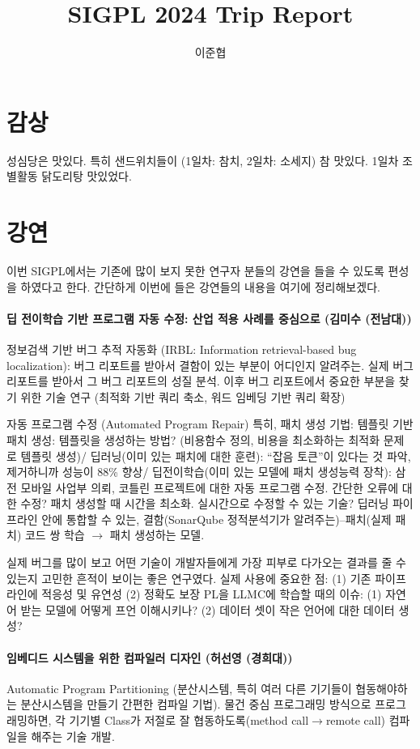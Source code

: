 \documentclass{article}
\title{SIGPL 2024 Trip Report}
\author{이준협}
\begin{document}
\maketitle
\section{감상}
성심당은 맛있다. 특히 샌드위치들이 (1일차: 참치, 2일차: 소세지) 참 맛있다.
1일차 조별활동 닭도리탕 맛있었다.
\section{강연}
이번 SIGPL에서는 기존에 많이 보지 못한 연구자 분들의 강연을 들을 수 있도록 편성을 하였다고 한다.
간단하게 이번에 들은 강연들의 내용을 여기에 정리해보겠다.

\paragraph{딥 전이학습 기반 프로그램 자동 수정: 산업 적용 사례를 중심으로 (김미수 (전남대))}
정보검색 기반 버그 추적 자동화 (IRBL: Information retrieval-based bug localization): 버그 리포트를 받아서 결함이 있는 부분이 어디인지 알려주는. 실제 버그 리포트를 받아서 그 버그 리포트의 성질 분석.
이후 버그 리포트에서 중요한 부분을 찾기 위한 기술 연구 (최적화 기반 쿼리 축소, 워드 임베딩 기반 쿼리 확장)

자동 프로그램 수정 (Automated Program Repair)
특히, 패치 생성 기법: 템플릿 기반 패치 생성: 템플릿을 생성하는 방법? (비용함수 정의, 비용을 최소화하는 최적화 문제로 템플릿 생성)/
딥러닝(이미 있는 패치에 대한 훈련): ``잡음 토큰''이 있다는 것 파악, 제거하니까 성능이 88\% 향상/
딥전이학습(이미 있는 모델에 패치 생성능력 장착): 삼전 모바일 사업부 의뢰, 코틀린 프로젝트에 대한 자동 프로그램 수정. 간단한 오류에 대한 수정?
패치 생성할 때 시간을 최소화. 실시간으로 수정할 수 있는 기술?
딥러닝 파이프라인 안에 통합할 수 있는, 결함(SonarQube 정적분석기가 알려주는)--패치(실제 패치) 코드 쌍 학습 $\rightarrow$ 패치 생성하는 모델.

실제 버그를 많이 보고 어떤 기술이 개발자들에게 가장 피부로 다가오는 결과를 줄 수 있는지 고민한 흔적이 보이는 좋은 연구였다.
실제 사용에 중요한 점: (1) 기존 파이프라인에 적응성 및 유연성 (2) 정확도 보장
PL을 LLMC에 학습할 때의 이슈: (1) 자연어 받는 모델에 어떻게 프언 이해시키나? (2) 데이터 셋이 작은 언어에 대한 데이터 생성?
\paragraph{임베디드 시스템을 위한 컴파일러 디자인 (허선영 (경희대))}
Automatic Program Partitioning (분산시스템, 특히 여러 다른 기기들이 협동해야하는 분산시스템을 만들기 간편한 컴파일 기법).
물건 중심 프로그래밍 방식으로 프로그래밍하면, 각 기기별 Class가 저절로 잘 협동하도록(method call$\rightarrow$remote call) 컴파일을 해주는 기술 개발.
\end{document}
